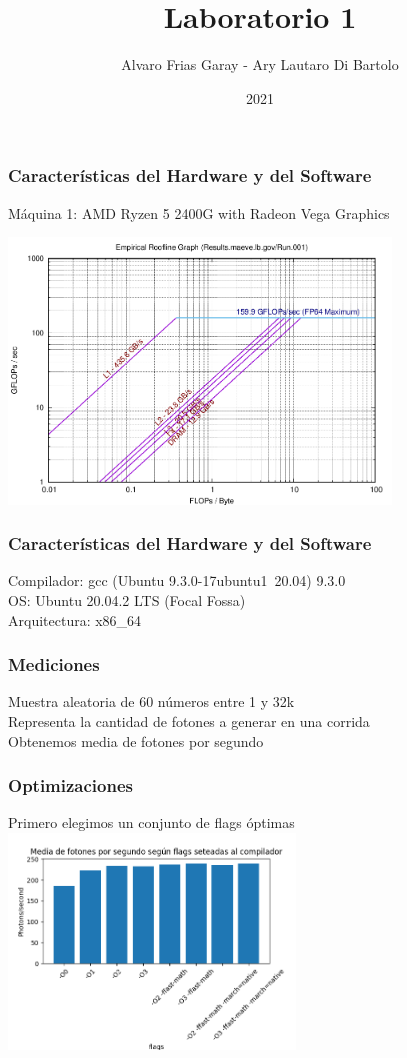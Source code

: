 \documentclass{beamer}
\title{Laboratorio 1}
\author{Alvaro Frias Garay - Ary Lautaro Di Bartolo}
\institute{Universidad Nacional de Córdoba - Universidad Nacional de Cuyo}
\date{2021}
\begin{document}
\frame{\titlepage}


\begin{frame}
    \frametitle{Características del Hardware y del Software}
    Máquina 1: AMD Ryzen 5 2400G with Radeon Vega Graphics

    \includegraphics[width=4in]{./imagenes/RTK_ALVARO.png}


\end{frame}

\begin{frame}
    \frametitle{Características del Hardware y del Software}
    Compilador: gcc (Ubuntu 9.3.0-17ubuntu1~20.04) 9.3.0 \\
    OS: Ubuntu 20.04.2 LTS (Focal Fossa) \\
    Arquitectura: x86\_64
\end{frame}

\begin{frame}
    \frametitle{Mediciones}
    Muestra aleatoria de 60 números entre 1 y 32k \\
    Representa la cantidad de fotones a generar en una corrida\\
    Obtenemos media de fotones por segundo
\end{frame}

\begin{frame}
    \frametitle{Optimizaciones}

    Primero elegimos un conjunto de flags óptimas \pause
    \includegraphics[width=3in]{./imagenes/comparacion_flags_sin_optimizar.png}

\end{frame}
\end{document}
